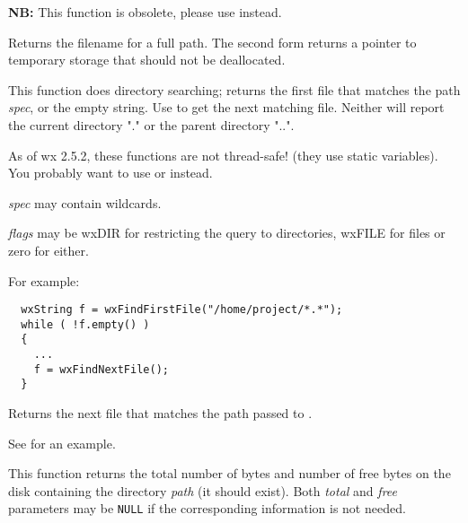 
{\bf NB:} This function is obsolete, please use
 instead.

Returns the filename for a full path. The second form returns a pointer to
temporary storage that should not be deallocated.


\label{wxfindfirstfile}


This function does directory searching; returns the first file
that matches the path {\it spec}, or the empty string. Use  to
get the next matching file. Neither will report the current directory "." or the
parent directory "..".


As of wx 2.5.2, these functions are not thread-safe! (they use static variables). You probably want to use  or  instead.

{\it spec} may contain wildcards.

{\it flags} may be wxDIR for restricting the query to directories, wxFILE for files or zero for either.

For example:

\begin{verbatim}
  wxString f = wxFindFirstFile("/home/project/*.*");
  while ( !f.empty() )
  {
    ...
    f = wxFindNextFile();
  }
\end{verbatim}


\label{wxfindnextfile}


Returns the next file that matches the path passed to .

See  for an example.


\label{wxgetdiskspace}


This function returns the total number of bytes and number of free bytes on
the disk containing the directory {\it path} (it should exist). Both
{\it total} and {\it free} parameters may be {\tt NULL} if the corresponding
information is not needed.

